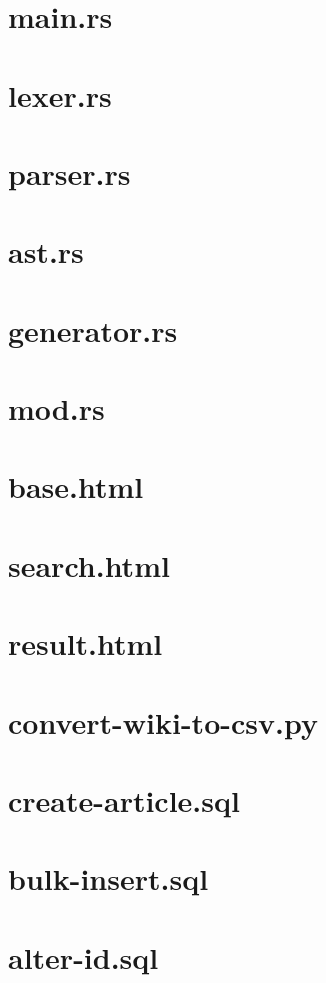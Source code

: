 \section{main.rs}

\section{lexer.rs}

\section{parser.rs}

\section{ast.rs}

\section{generator.rs}

\section{mod.rs}

\section{base.html}

\section{search.html}

\section{result.html}

\section{convert-wiki-to-csv.py}

\section{create-article.sql}

\section{bulk-insert.sql}

\section{alter-id.sql}
